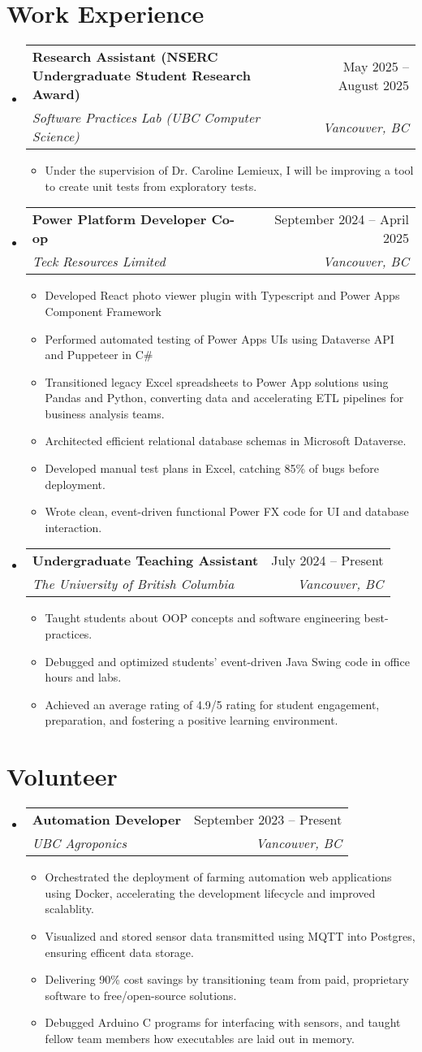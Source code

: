\documentclass[letterpaper,11pt]{article}
\makeatletter
\newcommand{\resumeItem}[1]{
  \item\small{
    {#1 \vspace{-2pt}}
  }
}
\newcommand{\resumeSubheading}[4]{
  \vspace{-2pt}\item
    \begin{tabular*}{0.97\textwidth}[t]{l@{\extracolsep{\fill}}r}
      \textbf{#1} & #2 \\
      \textit{\small#3} & \textit{\small #4} \\
    \end{tabular*}\vspace{-7pt}
}
\newcommand{\resumeSubHeadingListStart}{\begin{itemize}[leftmargin=0.15in, label={}]}
\newcommand{\resumeSubHeadingListEnd}{\end{itemize}}
\newcommand{\resumeItemListStart}{\begin{itemize}}
\newcommand{\resumeItemListEnd}{\end{itemize}\vspace{-5pt}}
\makeatother
\begin{document}
\section{Work Experience}
\resumeSubHeadingListStart


\resumeSubheading
{Research Assistant (NSERC Undergraduate Student Research Award)}{May 2025 -- August 2025}
{Software Practices Lab (UBC Computer Science)}{Vancouver, BC}
\resumeItemListStart
\resumeItem{Under the supervision of Dr. Caroline Lemieux, I will be improving a tool to create unit tests from exploratory tests.}
\resumeItemListEnd

\resumeSubheading
{Power Platform Developer Co-op}{September 2024 -- April 2025}
{Teck Resources Limited}{Vancouver, BC}
\resumeItemListStart
\resumeItem{Developed React photo viewer plugin with Typescript and Power Apps Component Framework}
\resumeItem{Performed automated testing of Power Apps UIs using Dataverse API and Puppeteer in C\#}
\resumeItem{Transitioned legacy Excel spreadsheets to Power App solutions using Pandas and Python, converting data and accelerating ETL pipelines for business analysis teams.}
\resumeItem{Architected efficient relational database schemas in Microsoft Dataverse.}
\resumeItem{Developed manual test plans in Excel, catching 85\% of bugs before deployment.}
\resumeItem{Wrote clean, event-driven functional Power FX code for UI and database interaction.}
\resumeItemListEnd

\resumeSubheading
{Undergraduate Teaching Assistant}{July 2024 -- Present}
{The University of British Columbia}{Vancouver, BC}
\resumeItemListStart
\resumeItem{Taught students about OOP concepts and software engineering best-practices.}
\resumeItem{Debugged and optimized students' event-driven Java Swing code in office hours and labs.}
\resumeItem{Achieved an average rating of 4.9/5 rating for student engagement, preparation, and fostering a positive learning environment.}
\resumeItemListEnd

\resumeSubHeadingListEnd


\section{Volunteer}
\resumeSubHeadingListStart


\resumeSubheading
{Automation Developer}{September 2023 -- Present}
{UBC Agroponics}{Vancouver, BC}
\resumeItemListStart
\resumeItem{Orchestrated the deployment of farming automation web applications using Docker, accelerating the development lifecycle and improved scalablity.}
\resumeItem{Visualized and stored sensor data transmitted using MQTT into Postgres, ensuring efficent data storage.}
\resumeItem{Delivering 90\% cost savings by transitioning team from paid, proprietary software to free/open-source solutions.}
\resumeItem{Debugged Arduino C programs for interfacing with sensors, and taught fellow team members how executables are laid out in memory.}
\resumeItemListEnd
\resumeSubHeadingListEnd
\end{document}

